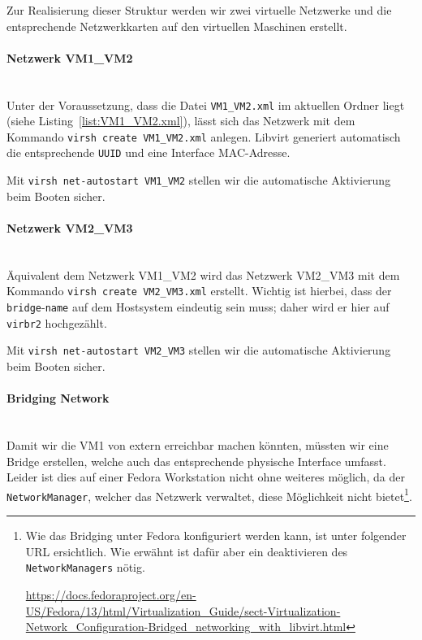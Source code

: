 Zur Realisierung dieser Struktur werden wir zwei virtuelle Netzwerke und die entsprechende Netzwerkkarten auf den virtuellen Maschinen erstellt.

\paragraph{Netzwerk VM1\_VM2} \hfill \\
Unter der Voraussetzung, dass die Datei \lstinline|VM1_VM2.xml| im aktuellen Ordner liegt (siehe Listing\nobreak\ \ref{list:VM1_VM2.xml}), lässt sich das Netzwerk mit dem Kommando \lstinline|virsh create VM1_VM2.xml| anlegen. Libvirt generiert automatisch die entsprechende \lstinline|UUID| und eine Interface MAC-Adresse.

Mit \lstinline|virsh net-autostart VM1_VM2| stellen wir die automatische Aktivierung beim Booten sicher.



\paragraph{Netzwerk VM2\_VM3} \hfill \\
Äquivalent dem Netzwerk VM1\_VM2 wird das Netzwerk VM2\_VM3 mit dem Kommando \lstinline[breaklines=false]|virsh create VM2_VM3.xml| erstellt. Wichtig ist hierbei, dass der \lstinline|bridge|-\lstinline|name| auf dem Hostsystem eindeutig sein muss; daher wird er hier auf \lstinline|virbr2| hochgezählt.

Mit \lstinline|virsh net-autostart VM2_VM3| stellen wir die automatische Aktivierung beim Booten sicher.



\paragraph{Bridging Network} \hfill \\
Damit wir die VM1 von extern erreichbar machen könnten, müssten wir eine Bridge erstellen, welche auch das entsprechende physische Interface umfasst. Leider ist dies auf einer Fedora Workstation nicht ohne weiteres möglich, da der \lstinline|NetworkManager|, welcher das Netzwerk verwaltet, diese Möglichkeit nicht bietet\footnote[42]{Wie das Bridging unter Fedora konfiguriert werden kann, ist unter folgender URL ersichtlich. Wie erwähnt ist dafür aber ein deaktivieren des \lstinline|NetworkManagers| nötig.

 \url{https://docs.fedoraproject.org/en-US/Fedora/13/html/Virtualization_Guide/sect-Virtualization-Network_Configuration-Bridged_networking_with_libvirt.html}}.

